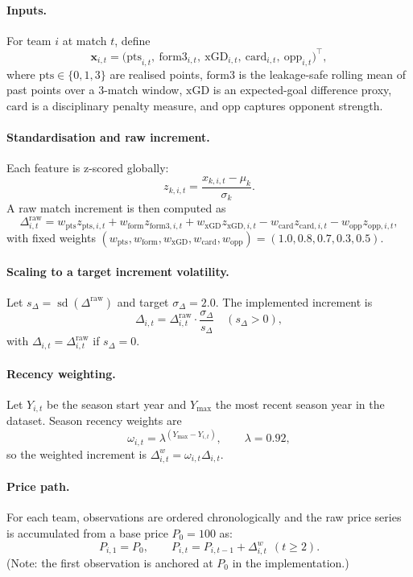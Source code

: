 \documentclass[11pt,a4paper]{article}
\begin{document}
\paragraph{Inputs.}
For team $i$ at match $t$, define
\[
\mathbf{x}_{i,t} =
\big(\text{pts}_{i,t},\ \text{form3}_{i,t},\ \text{xGD}_{i,t},\ \text{card}_{i,t},\ \text{opp}_{i,t}\big)^\top,
\]
where $\text{pts}\in\{0,1,3\}$ are realised points, $\text{form3}$ is the leakage-safe rolling mean of
past points over a 3-match window, $\text{xGD}$ is an expected-goal difference proxy, $\text{card}$ is
a disciplinary penalty measure, and $\text{opp}$ captures opponent strength.

\paragraph{Standardisation and raw increment.}
Each feature is z-scored globally:
\[
z_{k,i,t}=\frac{x_{k,i,t}-\mu_k}{\sigma_k}.
\]
A raw match increment is then computed as
\[
\Delta^{\text{raw}}_{i,t} =
w_{\text{pts}} z_{\text{pts},i,t}
+ w_{\text{form}} z_{\text{form3},i,t}
+ w_{\text{xGD}} z_{\text{xGD},i,t}
- w_{\text{card}} z_{\text{card},i,t}
- w_{\text{opp}} z_{\text{opp},i,t},
\]
with fixed weights $(w_{\text{pts}},w_{\text{form}},w_{\text{xGD}},w_{\text{card}},w_{\text{opp}})
=(1.0,0.8,0.7,0.3,0.5)$.

\paragraph{Scaling to a target increment volatility.}
Let $s_\Delta=\operatorname{sd}(\Delta^{\text{raw}})$ and target $\sigma_\Delta=2.0$. The implemented
increment is
\[
\Delta_{i,t}=\Delta^{\text{raw}}_{i,t}\cdot\frac{\sigma_\Delta}{s_\Delta}\quad (s_\Delta>0),
\]
with $\Delta_{i,t}=\Delta^{\text{raw}}_{i,t}$ if $s_\Delta=0$.

\paragraph{Recency weighting.}
Let $Y_{i,t}$ be the season start year and $Y_{\max}$ the most recent season year in the dataset.
Season recency weights are
\[
\omega_{i,t}=\lambda^{(Y_{\max}-Y_{i,t})},\qquad \lambda=0.92,
\]
so the weighted increment is $\Delta^w_{i,t}=\omega_{i,t}\Delta_{i,t}$.

\paragraph{Price path.}
For each team, observations are ordered chronologically and the raw price series is accumulated
from a base price $P_0=100$ as:
\[
P_{i,1}=P_0,\qquad P_{i,t}=P_{i,t-1}+\Delta^w_{i,t}\ \ (t\ge2).
\]
(Note: the first observation is anchored at $P_0$ in the implementation.)
\end{document}
